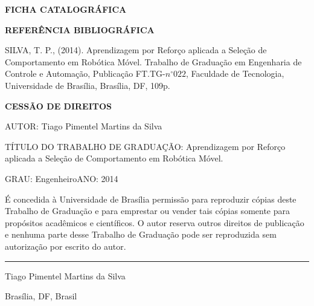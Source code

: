 \noindent \textbf{FICHA CATALOGRÁFICA}

\noindent %

\noindent \medskip{}


\noindent \textbf{REFERÊNCIA BIBLIOGRÁFICA}

SILVA, T. P., (2014). Aprendizagem por Reforço aplicada a 
Seleção de Comportamento em Robótica Móvel. 
Trabalho de Graduação em Engenharia de Controle e Automação,
Publicação FT.TG-$n^{\circ}022$, Faculdade de Tecnologia, Universidade
de Brasília, Brasília, DF, 109p.

\noindent \bigskip{}


\noindent \textbf{CESSÃO DE DIREITOS}

\noindent AUTOR: Tiago Pimentel Martins da Silva

TÍTULO DO TRABALHO DE GRADUAÇÃO: Aprendizagem por Reforço aplicada a 
Seleção de Comportamento em Robótica Móvel.

\noindent \medskip{}


\noindent GRAU: Engenheiro\hfill{}ANO: 2014\hfill{}

\noindent \medskip{}


É concedida à Universidade de Brasília permissão para reproduzir cópias
deste Trabalho de Graduação e para emprestar ou vender tais cópias
somente para propósitos acadêmicos e científicos. O autor reserva
outros direitos de publicação e nenhuma parte desse Trabalho de Graduação
pode ser reproduzida sem autorização por escrito do autor.

\noindent \bigskip{}


\noindent \rule[0.5ex]{1\columnwidth}{1pt}

\noindent Tiago Pimentel Martins da Silva

\noindent Brasília, DF, Brasil
